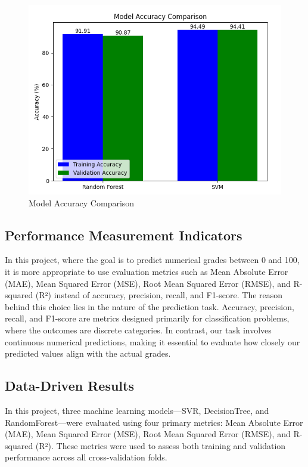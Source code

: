 \documentclass[titlepage]{article}
\begin{document}
\begin{figure}[H]
    \centering
    \includegraphics[width=0.5\linewidth]{Figure_1.png}
    \caption{Model Accuracy Comparison}
    \label{fig:enter-label}
\end{figure}

\subsection{Performance Measurement Indicators}

In this project, where the goal is to predict numerical grades between 0 and 100, it is more appropriate to use evaluation metrics such as Mean Absolute Error (MAE), Mean Squared Error (MSE), Root Mean Squared Error (RMSE), and R-squared (R²) instead of accuracy, precision, recall, and F1-score. The reason behind this choice lies in the nature of the prediction task. Accuracy, precision, recall, and F1-score are metrics designed primarily for classification problems, where the outcomes are discrete categories. In contrast, our task involves continuous numerical predictions, making it essential to evaluate how closely our predicted values align with the actual grades.

\subsection{Data-Driven Results}

In this project, three machine learning models—SVR, DecisionTree, and RandomForest—were evaluated using four primary metrics: Mean Absolute Error (MAE), Mean Squared Error (MSE), Root Mean Squared Error (RMSE), and R-squared (R²). These metrics were used to assess both training and validation performance across all cross-validation folds.
\end{document}
